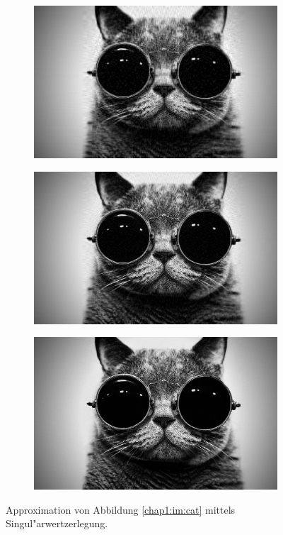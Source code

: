 \begin{figure}[h!]
\vspace{0.4cm}
\begin{subfigure}[c]{.3\textwidth}
\includegraphics[width=.9\linewidth]{images/Cat50}
\end{subfigure}
\begin{subfigure}[c]{.3\textwidth}
\includegraphics[width=.9\linewidth]{images/Cat100}
\label{im:chap1:subE}
\end{subfigure}
\begin{subfigure}[c]{.3\textwidth}
\includegraphics[width=.9\linewidth]{images/Cat300}
\label{im:chap1:subF}
\end{subfigure}

\caption{Approximation von Abbildung \ref{chap1:im:cat} mittels Singul"arwertzerlegung.}
\end{figure}

